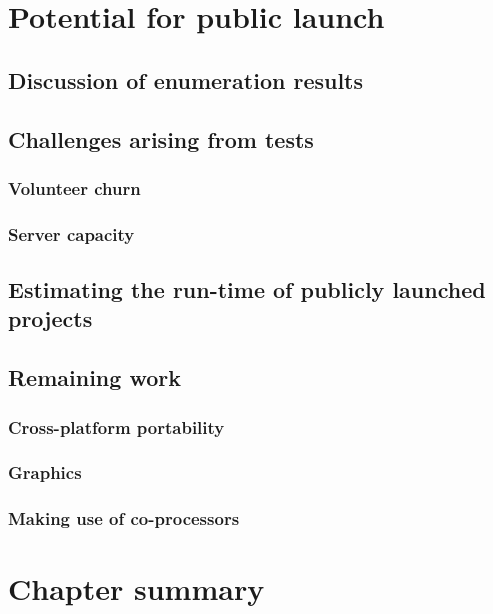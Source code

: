 \section{Potential for public launch}
\subsection{Discussion of enumeration results}
\subsection{Challenges arising from tests}
\subsubsection{Volunteer churn}
\subsubsection{Server capacity}
\subsection{Estimating the run-time of publicly launched projects}
\subsection{Remaining work}
\subsubsection{Cross-platform portability}
\subsubsection{Graphics}
\subsubsection{Making use of co-processors}

\section{Chapter summary}
